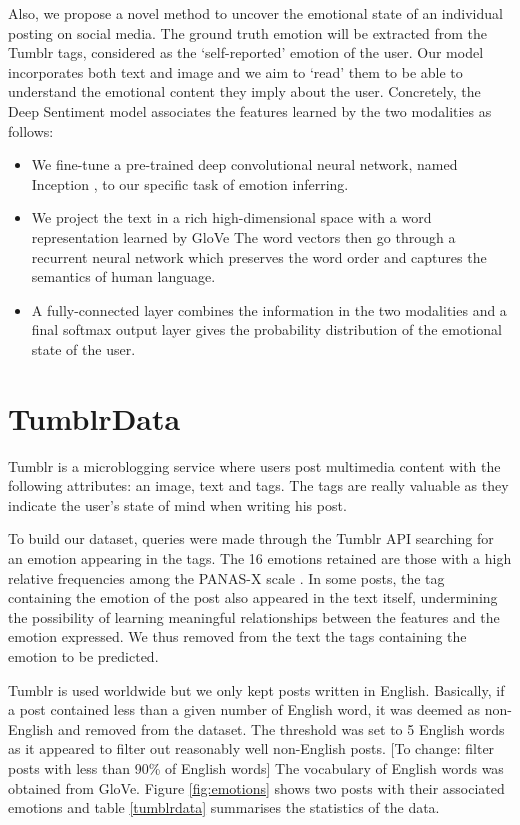 \documentclass{article} %
\begin{document}
Also, we propose a novel method to uncover the emotional state of an individual posting on social media. The ground truth emotion will be extracted from the Tumblr tags, considered as the `self-reported' emotion of the user. Our model incorporates both text and image and we aim to `read' them to be able to understand the emotional content they imply about the user. Concretely, the Deep Sentiment model associates the features learned by the two modalities as follows:

\begin{itemize}
    \item We fine-tune a pre-trained deep convolutional neural network, named Inception \citep{Szegedy-15}, to our specific task of emotion inferring.
    \item We project the text in a rich high-dimensional space with a word representation learned by GloVe \citep{Pennington-14} The word vectors then go through a recurrent neural network which preserves the word order and captures the semantics of human language.
    \item A fully-connected layer combines the information in the two modalities and a final softmax output layer gives the probability distribution of the emotional state of the user.
\end{itemize}


\section{TumblrData}

Tumblr is a microblogging service where users post multimedia content with the following attributes: an image, text and tags. The tags are really valuable as they indicate the user's state of mind when writing his post. 

To build our dataset, queries were made through the Tumblr API searching for an emotion appearing in the tags. The 16 emotions retained are those with a high relative frequencies among the PANAS-X scale \citep{PANAS-X}. In some posts, the tag containing the emotion of the post also appeared in the text itself, undermining the possibility of learning meaningful relationships between the features and the emotion expressed. We thus removed from the text the tags containing the emotion to be predicted.

Tumblr is used worldwide but we only kept posts written in English. Basically, if a post contained less than a given number of English word, it was deemed as non-English and removed from the dataset. The threshold was set to 5 English words as it appeared to filter out reasonably well non-English posts. [To change: filter posts with less than 90\% of English words] The vocabulary of English words was obtained from GloVe. Figure \ref{fig:emotions} shows two posts with their associated emotions and table \ref{tumblrdata} summarises the statistics of the data.
\end{document}
